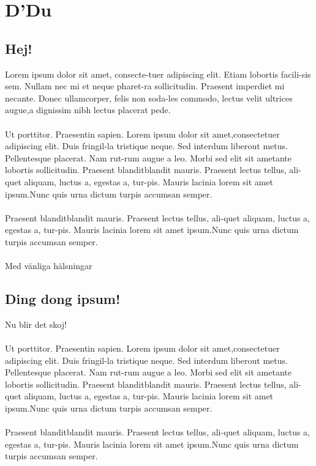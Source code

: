 \documentclass{dsekddu}
\begin{document}

\maketitle
\section{D'Du}
\begin{multicols*}{2}

\subsection{Hej!}
Lorem ipsum dolor sit amet, consecte-tuer adipiscing elit. Etiam lobortis facili-sis sem. Nullam nec mi et neque pharet-ra sollicitudin. Praesent imperdiet mi necante. Donec ullamcorper, felis non soda-les commodo, lectus velit ultrices augue,a dignissim nibh lectus placerat pede.
\\
\\
Ut porttitor. Praesentin sapien. Lorem ipsum dolor sit amet,consectetuer adipiscing elit. Duis fringil-la tristique neque. Sed interdum liberout metus. Pellentesque placerat. Nam rut-rum augue a leo. Morbi sed elit sit ametante lobortis sollicitudin. Praesent blanditblandit mauris. Praesent lectus tellus, ali-quet aliquam, luctus a, egestas a, tur-pis. Mauris lacinia lorem sit amet ipsum.Nunc quis urna dictum turpis accumsan semper.
 \\
 \\
Praesent blanditblandit mauris. Praesent lectus tellus, ali-quet aliquam, luctus a, egestas a, tur-pis. Mauris lacinia lorem sit amet ipsum.Nunc quis urna dictum turpis accumsan semper.
\\
\\
Med vänliga hälsningar

\subsection{Ding dong ipsum!}
Nu blir det skoj!
\\
\\
Ut porttitor. Praesentin sapien. Lorem ipsum dolor sit amet,consectetuer adipiscing elit. Duis fringil-la tristique neque. Sed interdum liberout metus. Pellentesque placerat. Nam rut-rum augue a leo. Morbi sed elit sit ametante lobortis sollicitudin. Praesent blanditblandit mauris. Praesent lectus tellus, ali-quet aliquam, luctus a, egestas a, tur-pis. Mauris lacinia lorem sit amet ipsum.Nunc quis urna dictum turpis accumsan semper.
 \\
 \\
Praesent blanditblandit mauris. Praesent lectus tellus, ali-quet aliquam, luctus a, egestas a, tur-pis. Mauris lacinia lorem sit amet ipsum.Nunc quis urna dictum turpis accumsan semper.
\\
\\


\end{multicols*}
\end{document}
